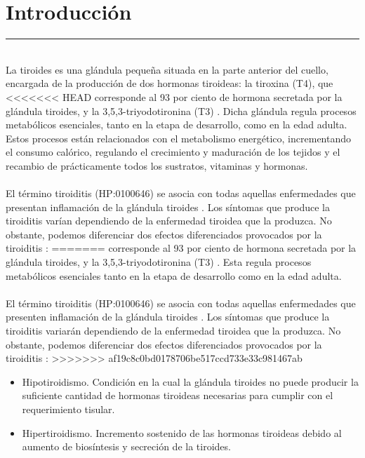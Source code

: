 \section{Introducción}

\hrule
\vspace{5mm}
\\
La tiroides es una glándula pequeña situada en la parte anterior del cuello, encargada de la producción de dos hormonas tiroideas: la tiroxina (T4), que 
<<<<<<< HEAD
corresponde al 93 por ciento de hormona secretada por la glándula tiroides, y la 3,5,3-triyodotironina (T3) \cite{Stegmann} . Dicha glándula regula procesos metabólicos esenciales, tanto en la etapa de desarrollo, como en la edad adulta. Estos procesos están relacionados con el metabolismo energético, incrementando el consumo calórico, regulando el crecimiento y maduración de los tejidos y el recambio de prácticamente todos los sustratos, vitaminas y hormonas.  \cite{Stegmann} 
\\ \\
El término tiroiditis (HP:0100646) se asocia con todas aquellas enfermedades que presentan inflamación de la glándula tiroides \cite{Sweeney2014}. Los síntomas que produce la tiroiditis varían dependiendo de la enfermedad tiroidea que la produzca. No obstante, podemos diferenciar dos efectos diferenciados provocados por la tiroiditis \cite{Pulgarin} : 
=======
corresponde al 93 por ciento de hormona secretada por la glándula tiroides, y la 3,5,3-triyodotironina (T3) \cite{Stegmann} . Esta regula procesos metabólicos esenciales tanto en la etapa de desarrollo como en la edad adulta. \cite{Stegmann} 
\\ \\
El término tiroiditis (HP:0100646) se asocia con todas aquellas enfermedades que presenten inflamación de la glándula tiroides \cite{Sweeney2014}. Los síntomas que produce la tiroiditis variarán dependiendo de la enfermedad tiroidea que la produzca. No obstante, podemos diferenciar dos efectos diferenciados provocados por la tiroiditis \cite{Pulgarin} : 
>>>>>>> af19c8c0bd0178706be517ccd733e33c981467ab
\begin{itemize}
    \item Hipotiroidismo. Condición en la cual la glándula tiroides no puede producir la suficiente cantidad de hormonas tiroideas necesarias para cumplir con el requerimiento tisular.
    \item Hipertiroidismo. Incremento sostenido de las hormonas tiroideas debido al aumento de biosíntesis y secreción de la tiroides.
\end{itemize} 
